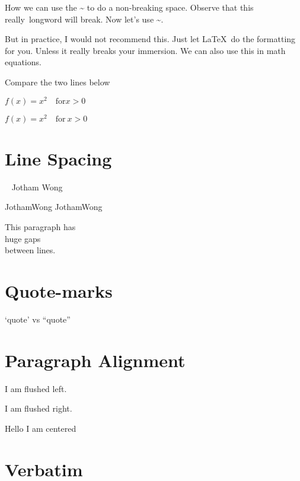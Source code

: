 \documentclass[12pt]{article}
\begin{document}
    How we can use the \~{} to do a non-breaking space. Observe that this really~longword will break. Now let's use \~{}.

    But in practice, I would not recommend this. Just let \LaTeX~do the formatting for you.
    Unless it really breaks your immersion.
    We can also use this in math equations.

    Compare the two lines below
    
    
    $f(x) = x^2 \quad \text{for} x > 0$

    $f(x) = x^2 \quad \text{for}~x > 0$

    \section{Line Spacing}

        ~ Jotham Wong   

        Jotham\singlespacing Wong
        Jotham\onehalfspace Wong

        \begin{spacing}{2.5}
            This paragraph has \\ huge gaps \\ between lines.
        \end{spacing}

    \section{Quote-marks}
    `quote' vs ``quote''

    \section{Paragraph Alignment}

        \begin{flushleft}
            I am flushed left.    
        \end{flushleft}


        \begin{flushright}
            I am flushed right.    
        \end{flushright}

        \begin{center}
            Hello I am centered
        \end{center}


    \section{Verbatim}
        
\end{document}
